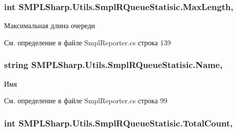 \hypertarget{class_s_m_p_l_sharp_1_1_utils_1_1_smpl_r_queue_statisic_af0c96a5114802513777f2d4cf5e176b9}{
\subsubsection[{Max\-Length}]{\setlength{\rightskip}{0pt plus 5cm}int S\-M\-P\-L\-Sharp.\-Utils.\-Smpl\-R\-Queue\-Statisic.\-Max\-Length\hspace{0.3cm}{\ttfamily [get]}, {\ttfamily [set]}}}\label{de/de9/class_s_m_p_l_sharp_1_1_utils_1_1_smpl_r_queue_statisic_af0c96a5114802513777f2d4cf5e176b9}


Максимальная длина очереди 



См. определение в файле Smpl\-Reporter.\-cs строка 139

\hypertarget{class_s_m_p_l_sharp_1_1_utils_1_1_smpl_r_queue_statisic_aaa07c8c4d4ff07e2cb102dcadc700860}{
\subsubsection[{Name}]{\setlength{\rightskip}{0pt plus 5cm}string S\-M\-P\-L\-Sharp.\-Utils.\-Smpl\-R\-Queue\-Statisic.\-Name\hspace{0.3cm}{\ttfamily [get]}, {\ttfamily [set]}}}\label{de/de9/class_s_m_p_l_sharp_1_1_utils_1_1_smpl_r_queue_statisic_aaa07c8c4d4ff07e2cb102dcadc700860}


Имя 



См. определение в файле Smpl\-Reporter.\-cs строка 99

\hypertarget{class_s_m_p_l_sharp_1_1_utils_1_1_smpl_r_queue_statisic_aba57ab69353bec5cd8415a53bd6644fe}{
\subsubsection[{Total\-Count}]{\setlength{\rightskip}{0pt plus 5cm}int S\-M\-P\-L\-Sharp.\-Utils.\-Smpl\-R\-Queue\-Statisic.\-Total\-Count\hspace{0.3cm}{\ttfamily [get]}, {\ttfamily [set]}}}\label{de/de9/class_s_m_p_l_sharp_1_1_utils_1_1_smpl_r_queue_statisic_aba57ab69353bec5cd8415a53bd6644fe}


